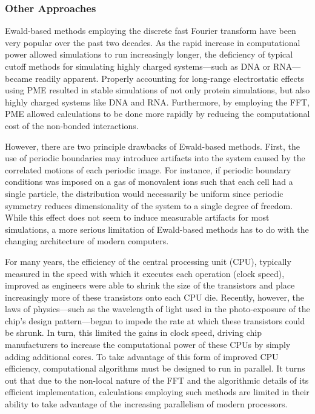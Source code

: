 \subsubsection{Other Approaches}

Ewald-based methods employing the discrete fast Fourier transform have been very
popular over the past two decades. As the rapid increase in computational power
allowed simulations to run increasingly longer, the deficiency of typical cutoff
methods for simulating highly charged systems---such as DNA or RNA---became
readily apparent. \cite{Miaskiewicz_JAmChemSoc_1993_v115_p1526,
McConnell_JAmChemSoc_1994_v116_p4461} Properly accounting for long-range
electrostatic effects using PME resulted in stable simulations of not only
protein simulations, but also highly charged systems like DNA and RNA.
\cite{Cheatham_JAmChemSoc_1995_v117_p4193} Furthermore, by employing the FFT,
PME allowed calculations to be done more rapidly by reducing the computational
cost of the non-bonded interactions.

However, there are two principle drawbacks of Ewald-based methods. First, the
use of periodic boundaries may introduce artifacts into the system caused by the
correlated motions of each periodic image.
\cite{Hunenberger_JChemPhys_1999_v110_p1856} For instance, if periodic boundary
conditions was imposed on a gas of monovalent ions such that each cell had a
single particle, the distribution would necessarily be uniform since periodic
symmetry reduces dimensionality of the system to a single degree of freedom.
While this effect does not seem to induce measurable artifacts for most
simulations, \cite{Hunenberger_JChemPhys_1999_v110_p1856} a more serious
limitation of Ewald-based methods has to do with the changing architecture of
modern computers.

For many years, the efficiency of the central processing unit (CPU), typically
measured in the speed with which it executes each operation (\ie clock speed),
improved as engineers were able to shrink the size of the transistors and place
increasingly more of these transistors onto each CPU die. Recently, however, the
laws of physics---such as the wavelength of light used in the photo-exposure of
the chip's design pattern---began to impede the rate at which these transistors
could be shrunk. In turn, this limited the gains in clock speed, driving chip
manufacturers to increase the computational power of these CPUs by simply adding
additional cores. To take advantage of this form of improved CPU efficiency,
computational algorithms must be designed to run in parallel. It turns out that
due to the non-local nature of the FFT and the algorithmic details of its
efficient implementation, calculations employing such methods are limited in
their ability to take advantage of the increasing parallelism of modern
processors.

